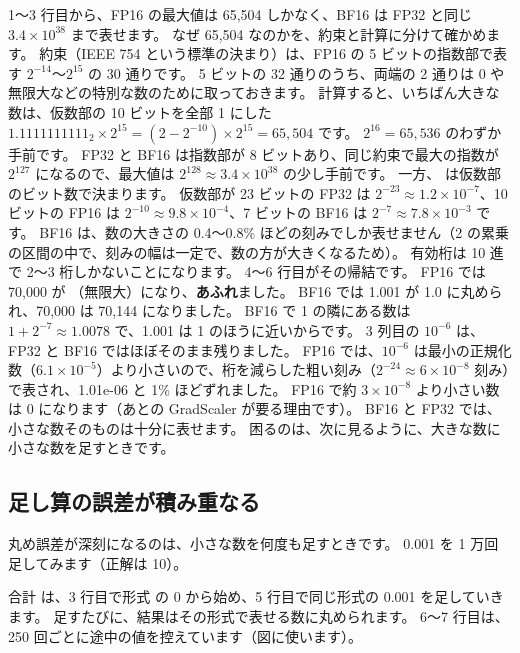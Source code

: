 1〜3 行目から、FP16 の最大値は 65,504 しかなく、BF16 は FP32 と同じ $3.4\times10^{38}$ まで表せます。
なぜ 65,504 なのかを、約束と計算に分けて確かめます。
約束（IEEE 754 という標準の決まり）は、FP16 の 5 ビットの指数部で表す $2^{-14}$〜$2^{15}$ の 30 通りです。
5 ビットの 32 通りのうち、両端の 2 通りは 0 や無限大などの特別な数のために取っておきます。
計算すると、いちばん大きな数は、仮数部の 10 ビットを全部 1 にした $1.1111111111_2\times2^{15}=(2-2^{-10})\times2^{15}=65{,}504$ です。
$2^{16}=65{,}536$ のわずか手前です。
FP32 と BF16 は指数部が 8 ビットあり、同じ約束で最大の指数が $2^{127}$ になるので、最大値は $2^{128}\approx3.4\times10^{38}$ の少し手前です。
一方、 は仮数部のビット数で決まります。
仮数部が 23 ビットの FP32 は $2^{-23}\approx1.2\times10^{-7}$、10 ビットの FP16 は $2^{-10}\approx9.8\times10^{-4}$、7 ビットの BF16 は $2^{-7}\approx7.8\times10^{-3}$ です。
BF16 は、数の大きさの 0.4〜0.8\% ほどの刻みでしか表せません（2 の累乗の区間の中で、刻みの幅は一定で、数の方が大きくなるため）。
有効桁は 10 進で 2〜3 桁しかないことになります。
4〜6 行目がその帰結です。
FP16 では 70,000 が （無限大）になり、\textbf{あふれ}ました。
BF16 では 1.001 が 1.0 に丸められ、70,000 は 70,144 になりました。
BF16 で 1 の隣にある数は $1+2^{-7}\approx1.0078$ で、1.001 は 1 のほうに近いからです。
3 列目の $10^{-6}$ は、FP32 と BF16 ではほぼそのまま残りました。
FP16 では、$10^{-6}$ は最小の正規化数（$6.1\times10^{-5}$）より小さいので、桁を減らした粗い刻み（$2^{-24}\approx6\times10^{-8}$ 刻み）で表され、1.01e-06 と 1\% ほどずれました。
FP16 で約 $3\times10^{-8}$ より小さい数は 0 になります（あとの GradScaler が要る理由です）。
BF16 と FP32 では、小さな数そのものは十分に表せます。
困るのは、次に見るように、大きな数に小さな数を足すときです。

\subsection*{足し算の誤差が積み重なる}

丸め誤差が深刻になるのは、小さな数を何度も足すときです。
0.001 を 1 万回足してみます（正解は 10）。


合計  は、3 行目で形式  の 0 から始め、5 行目で同じ形式の 0.001 を足していきます。
足すたびに、結果はその形式で表せる数に丸められます。
6〜7 行目は、250 回ごとに途中の値を控えています（図に使います）。

